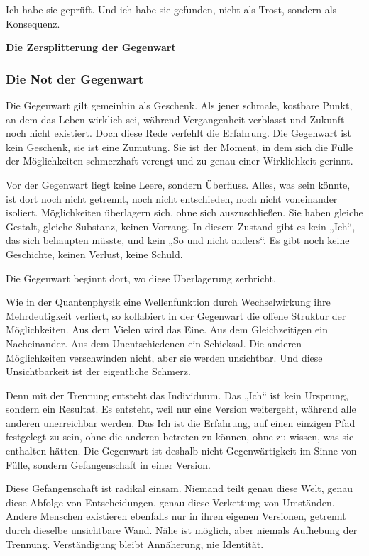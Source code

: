 \documentclass[
  ngerman,
]{article}
\begin{document}
Ich habe sie geprüft. Und ich habe sie gefunden, nicht als Trost,
sondern als Konsequenz.

\textbf{Die Zersplitterung der Gegenwart}

\subsubsection{\texorpdfstring{\textbf{Die Not der
Gegenwart}}{Die Not der Gegenwart}}\label{die-not-der-gegenwart}

Die Gegenwart gilt gemeinhin als Geschenk. Als jener schmale, kostbare
Punkt, an dem das Leben wirklich sei, während Vergangenheit verblasst
und Zukunft noch nicht existiert. Doch diese Rede verfehlt die
Erfahrung. Die Gegenwart ist kein Geschenk, sie ist eine Zumutung. Sie
ist der Moment, in dem sich die Fülle der Möglichkeiten schmerzhaft
verengt und zu genau einer Wirklichkeit gerinnt.

Vor der Gegenwart liegt keine Leere, sondern Überfluss. Alles, was sein
könnte, ist dort noch nicht getrennt, noch nicht entschieden, noch nicht
voneinander isoliert. Möglichkeiten überlagern sich, ohne sich
auszuschließen. Sie haben gleiche Gestalt, gleiche Substanz, keinen
Vorrang. In diesem Zustand gibt es kein „Ich``, das sich behaupten
müsste, und kein „So und nicht anders``. Es gibt noch keine Geschichte,
keinen Verlust, keine Schuld.

Die Gegenwart beginnt dort, wo diese Überlagerung zerbricht.

Wie in der Quantenphysik eine Wellenfunktion durch Wechselwirkung ihre
Mehrdeutigkeit verliert, so kollabiert in der Gegenwart die offene
Struktur der Möglichkeiten. Aus dem Vielen wird das Eine. Aus dem
Gleichzeitigen ein Nacheinander. Aus dem Unentschiedenen ein Schicksal.
Die anderen Möglichkeiten verschwinden nicht, aber sie werden
unsichtbar. Und diese Unsichtbarkeit ist der eigentliche Schmerz.

Denn mit der Trennung entsteht das Individuum. Das „Ich`` ist kein
Ursprung, sondern ein Resultat. Es entsteht, weil nur eine Version
weitergeht, während alle anderen unerreichbar werden. Das Ich ist die
Erfahrung, auf einen einzigen Pfad festgelegt zu sein, ohne die anderen
betreten zu können, ohne zu wissen, was sie enthalten hätten. Die
Gegenwart ist deshalb nicht Gegenwärtigkeit im Sinne von Fülle, sondern
Gefangenschaft in einer Version.

Diese Gefangenschaft ist radikal einsam. Niemand teilt genau diese Welt,
genau diese Abfolge von Entscheidungen, genau diese Verkettung von
Umständen. Andere Menschen existieren ebenfalls nur in ihren eigenen
Versionen, getrennt durch dieselbe unsichtbare Wand. Nähe ist möglich,
aber niemals Aufhebung der Trennung. Verständigung bleibt Annäherung,
nie Identität.
\end{document}
